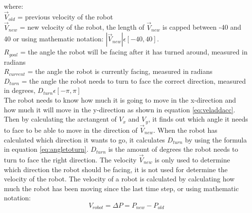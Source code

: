 where:
\\
$\vec{V}_{old}$ = previous velocity of the robot
\\
$\vec{V}_{new}$ = new velocity of the robot, the length of $\vec{V}_{new}$ is capped between -40 and 40 or using mathematic notation: $ |\vec{V}_{new}| \epsilon [-40,40]$.
\\
$R_{goal}$ = the angle the robot will be facing after it has turned around, measured in radians
\\
$R_{current}$ = the angle the robot is currently facing, measured in radians
\\
$D_{turn}$ = the angle the robot needs to turn to face the correct direction, measured in degrees, $D_{turn} \epsilon [-\pi,\pi]$
\\

The robot needs to know how much it is going to move in the x-direction and how much it will move in the y-direction as shown in equation \ref{eq:veladdacc}.
Then by calculating the arctangent of $V_x$ and $V_y$, it finds out which angle it needs to face to be able to move in the direction of $\vec{V}_{new}$. When the robot has calculated which direction it wants to go, it calculates $D_{turn}$ by using the formula in equation \ref{eq:angletoturn}. $D_{turn}$ is the amount of degrees the robot needs to turn to face the right direction. The velocity $\vec{V}_{new}$ is only used to determine which direction the robot should be facing, it is not used for determine the velocity of the robot. The velocity of a robot is calculated by calculating how much the robot has been moving since the last time step, or using mathematic notation: 
\begin{equation}
\label{eq:calcrobvel}
V_{robot} = \Delta P = P_{new} - P_{old}
\end{equation}

